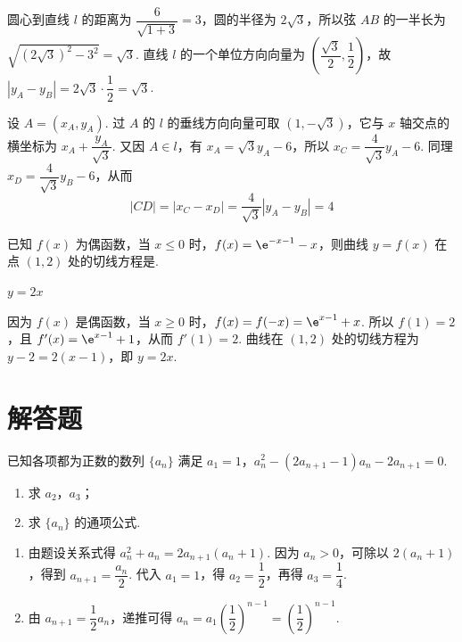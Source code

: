 \begin{solution}
圆心到直线 \(l\) 的距离为 \(\dfrac6{\sqrt{1+3}}=3\)，圆的半径为 \(2\sqrt3\)，所以弦 \(AB\) 的一半长为 \(\sqrt{(2\sqrt3)^2-3^2}=\sqrt3\). 直线 \(l\) 的一个单位方向向量为 \(\left(\dfrac{\sqrt3}{2},\dfrac12\right)\)，故 \(|y_A-y_B|=2\sqrt3\cdot\dfrac12=\sqrt3\).

设 \(A=(x_A,y_A)\). 过 \(A\) 的 \(l\) 的垂线方向向量可取 \((1,-\sqrt3)\)，它与 \(x\) 轴交点的横坐标为 \(x_A+\dfrac{y_A}{\sqrt3}\). 又因 \(A\in l\)，有 \(x_A=\sqrt3 y_A-6\)，所以 \(x_C=\dfrac4{\sqrt3}y_A-6\). 同理 \(x_D=\dfrac4{\sqrt3}y_B-6\)，从而
\[
|CD|=|x_C-x_D|=\frac4{\sqrt3}|y_A-y_B|=4
\]
\end{solution}

\begin{problem}
已知 \(f(x)\) 为偶函数，当 \(x\le0\) 时，\(f(x)=\e^{-x-1}-x\)，则曲线 \(y=f(x)\) 在点 \((1,2)\) 处的切线方程是\fillinblank{}.
\end{problem}

\begin{answer}
\(y=2x\)
\end{answer}

\begin{solution}
因为 \(f(x)\) 是偶函数，当 \(x\ge0\) 时，\(f(x)=f(-x)=\e^{x-1}+x\). 所以 \(f(1)=2\)，且 \(f'(x)=\e^{x-1}+1\)，从而 \(f'(1)=2\). 曲线在 \((1,2)\) 处的切线方程为 \(y-2=2(x-1)\)，即 \(y=2x\).
\end{solution}


\section{解答题}

\begin{problem}
已知各项都为正数的数列 \(\{a_n\}\) 满足 \(a_1=1\)，\(a_n^2-\left( 2a_{n+1}-1 \right)a_n-2a_{n+1}=0\).

\begin{enumerate}
\item 求 \(a_2\)，\(a_3\)；
\item 求 \(\{a_n\}\) 的通项公式.
\end{enumerate}
\end{problem}

\begin{solution}
\begin{enumerate}
\item 由题设关系式得 \(a_n^2+a_n=2a_{n+1}(a_n+1)\). 因为 \(a_n>0\)，可除以 \(2(a_n+1)\)，得到 \(a_{n+1}=\dfrac{a_n}{2}\). 代入 \(a_1=1\)，得 \(a_2=\dfrac12\)，再得 \(a_3=\dfrac14\).
\item 由 \(a_{n+1}=\dfrac12a_n\)，递推可得 \(a_n=a_1\left(\dfrac12\right)^{n-1}=\left(\dfrac12\right)^{n-1}\).
\end{enumerate}
\end{solution}


